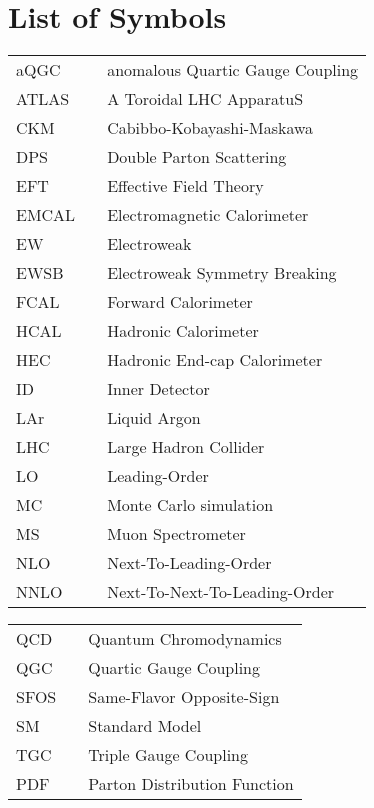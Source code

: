 \chapter*{List of Symbols}
  \begin{tabular}{lp{}p{}}
    aQGC        & \dotfill & anomalous Quartic Gauge Coupling \\
    ATLAS       & \dotfill & A Toroidal LHC ApparatuS \\
    CKM         & \dotfill & Cabibbo-Kobayashi-Maskawa \\
    DPS         & \dotfill & Double Parton Scattering \\
    EFT         & \dotfill & Effective Field Theory \\
    EMCAL       & \dotfill & Electromagnetic Calorimeter \\
    EW          & \dotfill & Electroweak \\
    EWSB        & \dotfill & Electroweak Symmetry Breaking \\
    FCAL        & \dotfill & Forward Calorimeter \\
    HCAL        & \dotfill & Hadronic Calorimeter \\
    HEC         & \dotfill & Hadronic End-cap Calorimeter \\
    ID          & \dotfill & Inner Detector \\
    LAr         & \dotfill & Liquid Argon \\
    LHC         & \dotfill & Large Hadron Collider \\
    LO          & \dotfill & Leading-Order \\
    MC          & \dotfill & Monte Carlo simulation \\
    MS          & \dotfill & Muon Spectrometer \\
    NLO         & \dotfill & Next-To-Leading-Order \\
    NNLO         & \dotfill & Next-To-Next-To-Leading-Order \\
  \end{tabular}

  \begin{tabular}{lp{}p{}}
    QCD         & \dotfill & Quantum Chromodynamics \\
    QGC         & \dotfill & Quartic Gauge Coupling \\
    SFOS        & \dotfill & Same-Flavor Opposite-Sign \\
    SM          & \dotfill & Standard Model  \\
    TGC         & \dotfill & Triple Gauge Coupling \\
    PDF         & \dotfill & Parton Distribution Function \\

  \end{tabular}


